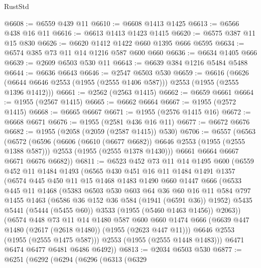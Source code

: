 \begin{lexlean}{RustStd}
\begin{coremodule}
@6608 := @6559 @439 @11
@6610 := @6608 @1413 @1425
@6613 := @6566 @438 @16 @11
@6616 := @6613 @1413 @1423 @1415
@6620 := @6575 @387 @11 @15 @830
@6626 := @6620 @1412 @1422 @660 @1395 @666 @6595
@6634 := @6574 @385 @73 @11 @14 @1216 @587 @600 @660
@6636 := @6634 @1405 @666
@6639 := @2609 @6503 @530 @11
@6643 := @6639 @384 @1216 @5484 @5488
@6644 := @6636 @6643
@6646 := @2547 @6503 @530
@6659 := @6616
    (@6626 (@6644 @6646 @2553 (@1955 (@2555 @1406 @587))) @2553 (@1955 (@2555 @1396 @1412)))
@6661 := @2562 (@2563 @1415)
@6662 := @6659 @6661
@6664 := @1955 (@2567 @1415)
@6665 := @6662 @6664
@6667 := @1955 (@2572 @1415)
@6668 := @6665 @6667
@6671 := @1955 (@2576 @1415 @16)
@6672 := @6668 @6671
@6676 := @1955 (@2581 @436 @16 @11)
@6677 := @6672 @6676
@6682 := @1955 (@2058 (@2059 (@2587 @1415)) @530)
@6706 := @6557
    (@6563
      (@6572
        (@6596
          (@6606 (@6610 (@6677 @6682)) @6646 @2553 (@1955 (@2555 @1388 @587)))
          @2553
          (@1955 (@2555 @1378 @1430)))
        @6661
        @6664
        @6667
        @6671
        @6676
        @6682))
@6811 := @6523
    @452
    @73
    @11
    @14
    @1495
    @600
    (@6559
      @452
      @11
      @1484
      @1493
      (@6565
        @430
        @451
        @16
        @11
        @1484
        @1491
        @1357
        (@6574
          @445
          @450
          @11
          @15
          @1468
          @1483
          @1490
          @660
          @1447
          @666
          (@6533
            @445
            @11
            @1468
            (@5383
              @6503
              @530
              @603
              @64
              @36
              @60
              @16
              @11
              @584
              @797
              @1455
              @1463
              (@6586 @36 @152 @36 @584 (@1941 (@6591 @36)) @1952)
              @5435
              @5441
              (@5444 (@5455 @60))
              @3533
              (@1955 (@5460 @1463 @1456))
              @2063))
          (@6574
            @448
            @73
            @11
            @14
            @1480
            @587
            @600
            @660
            @1474
            @666
            (@6639 @447 @1480 (@2617 (@2618 @1480)) (@1955 (@2623 @447 @11)))
            @6646
            @2553
            (@1955 (@2555 @1475 @587)))
          @2553
          (@1955 (@2555 @1448 @1483)))
        @6471
        @6474
        @6477
        @6481
        @6486
        @6492))
@6813 := @2034 @6503 @530
@6877 := @6251
    (@6292
      (@6294
        (@6296
          (@6313
            (@6329

\end{coremodule}
\end{lexlean}
